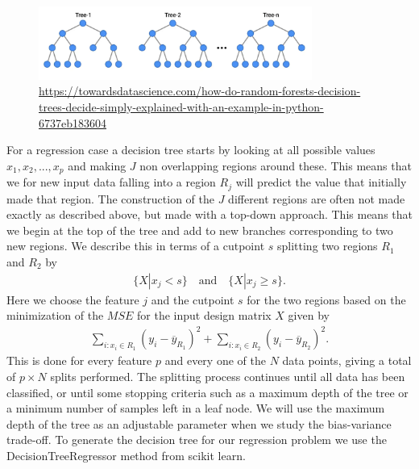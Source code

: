 \documentclass[11pt]{article}
\begin{document}
\begin{figure}[H]
    \centering
    \includegraphics[width=0.8\textwidth]{../figures/Decision_tree.png}
    \caption{\url{https://towardsdatascience.com/how-do-random-forests-decision-trees-decide-simply-explained-with-an-example-in-python-6737eb183604}}
    \label{fig:tree}
\end{figure}


For a regression case a decision tree starts by looking at all possible values $x_1,x_2,...,x_p$ and making $J$ non overlapping regions around these. This means that we for new input data falling into a region $R_j$ will predict the value that initially made that region. The construction of the $J$ different regions are often not made exactly as described above, but made with a top-down approach. This means that we begin at the top of the tree and add to new branches corresponding to two new regions. We describe this in terms of a cutpoint $s$ splitting two regions $R_1$ and $R_2$ by
\begin{align*}
    \{X|x_j < s\} \quad\text{and}\quad \{X|x_j \geq s\}.
\end{align*}
Here we choose the feature $j$ and the cutpoint $s$ for the two regions based on the minimization of the $MSE$ for the input design matrix $X$ given by
\begin{align*}
    \sum_{i:x_i \in R_1} (y_i - \overline{y}_{R_1})^2  + \sum_{i:x_i \in R_2} (y_i - \overline{y}_{R_2})^2.
\end{align*}
This is done for every feature $p$ and every one of the $N$ data points, giving a total of $p \times N $ splits performed. The splitting process continues until all data has been classified, or until some stopping criteria such as a maximum depth of the tree or a minimum number of samples left in a leaf node. We will use the maximum depth of the tree as an adjustable parameter when we study the bias-variance trade-off. To generate the decision tree for our regression problem we use the DecisionTreeRegressor method from scikit learn.
\end{document}
